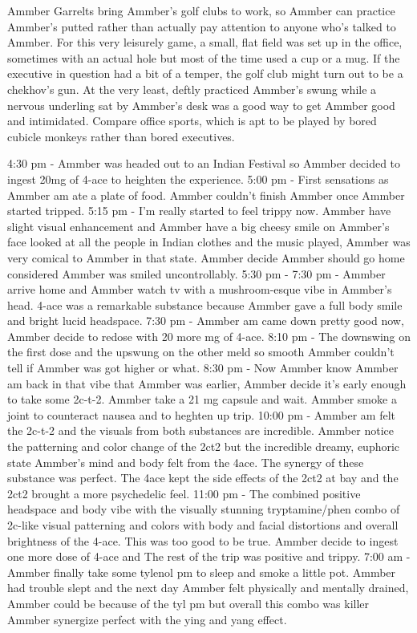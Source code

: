 \documentclass[12pt]{book}
\begin{document}
Ammber Garrelts bring Ammber's golf clubs to work, so Ammber can practice Ammber's putted rather than actually pay attention to anyone who's talked to Ammber. For this very leisurely game, a small, flat field was set up in the office, sometimes with an actual hole but most of the time used a cup or a mug. If the executive in question had a bit of a temper, the golf club might turn out to be a chekhov's gun. At the very least, deftly practiced Ammber's swung while a nervous underling sat by Ammber's desk was a good way to get Ammber good and intimidated. Compare office sports, which is apt to be played by bored cubicle monkeys rather than bored executives.



4:30 pm - Ammber was headed out to an Indian Festival so Ammber decided to ingest 20mg of 4-ace to heighten the experience. 5:00 pm - First sensations as Ammber am ate a plate of food. Ammber couldn't finish Ammber once Ammber started tripped. 5:15 pm - I'm really started to feel trippy now. Ammber have slight visual enhancement and Ammber have a big cheesy smile on Ammber's face looked at all the people in Indian clothes and the music played, Ammber was very comical to Ammber in that state. Ammber decide Ammber should go home considered Ammber was smiled uncontrollably. 5:30 pm - 7:30 pm - Ammber arrive home and Ammber watch tv with a mushroom-esque vibe in Ammber's head. 4-ace was a remarkable substance because Ammber gave a full body smile and bright lucid headspace. 7:30 pm - Ammber am came down pretty good now, Ammber decide to redose with 20 more mg of 4-ace. 8:10 pm - The downswing on the first dose and the upswung on the other meld so smooth Ammber couldn't tell if Ammber was got higher or what. 8:30 pm - Now Ammber know Ammber am back in that vibe that Ammber was earlier, Ammber decide it's early enough to take some 2c-t-2. Ammber take a 21 mg capsule and wait. Ammber smoke a joint to counteract nausea and to heghten up trip. 10:00 pm - Ammber am felt the 2c-t-2 and the visuals from both substances are incredible. Ammber notice the patterning and color change of the 2ct2 but the incredible dreamy, euphoric state Ammber's mind and body felt from the 4ace. The synergy of these substance was perfect. The 4ace kept the side effects of the 2ct2 at bay and the 2ct2 brought a more psychedelic feel. 11:00 pm - The combined positive headspace and body vibe with the visually stunning tryptamine/phen combo of 2c-like visual patterning and colors with body and facial distortions and overall brightness of the 4-ace. This was too good to be true. Ammber decide to ingest one more dose of 4-ace and The rest of the trip was positive and trippy. 7:00 am - Ammber finally take some tylenol pm to sleep and smoke a little pot. Ammber had trouble slept and the next day Ammber felt physically and mentally drained, Ammber could be because of the tyl pm but overall this combo was killer Ammber synergize perfect with the ying and yang effect.
\end{document}
